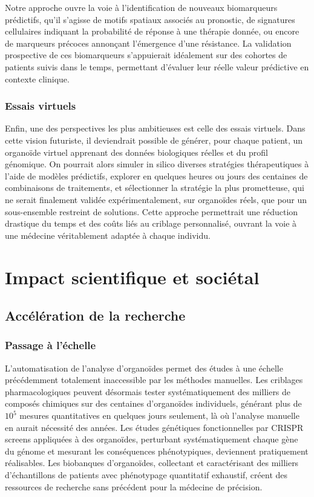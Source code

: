 Notre approche ouvre la voie à l’identification de nouveaux biomarqueurs prédictifs, qu’il s’agisse de motifs spatiaux associés au pronostic, de signatures cellulaires indiquant la probabilité de réponse à une thérapie donnée, ou encore de marqueurs précoces annonçant l’émergence d’une résistance. La validation prospective de ces biomarqueurs s’appuierait idéalement sur des cohortes de patients suivis dans le temps, permettant d’évaluer leur réelle valeur prédictive en contexte clinique.

\subsubsection{Essais virtuels}

Enfin, une des perspectives les plus ambitieuses est celle des essais virtuels. Dans cette vision futuriste, il deviendrait possible de générer, pour chaque patient, un organoïde virtuel apprenant des données biologiques réelles et du profil génomique. On pourrait alors simuler in silico diverses stratégies thérapeutiques à l’aide de modèles prédictifs, explorer en quelques heures ou jours des centaines de combinaisons de traitements, et sélectionner la stratégie la plus prometteuse, qui ne serait finalement validée expérimentalement, sur organoïdes réels, que pour un sous-ensemble restreint de solutions. Cette approche permettrait une réduction drastique du temps et des coûts liés au criblage personnalisé, ouvrant la voie à une médecine véritablement adaptée à chaque individu.

\section{Impact scientifique et sociétal}

\subsection{Accélération de la recherche}

\subsubsection{Passage à l'échelle}

L'automatisation de l'analyse d'organoïdes permet des études à une échelle précédemment totalement inaccessible par les méthodes manuelles. Les criblages pharmacologiques peuvent désormais tester systématiquement des milliers de composés chimiques sur des centaines d'organoïdes individuels, générant plus de $10^5$ mesures quantitatives en quelques jours seulement, là où l'analyse manuelle en aurait nécessité des années. Les études génétiques fonctionnelles par CRISPR screens appliquées à des organoïdes, perturbant systématiquement chaque gène du génome et mesurant les conséquences phénotypiques, deviennent pratiquement réalisables. Les biobanques d'organoïdes, collectant et caractérisant des milliers d'échantillons de patients avec phénotypage quantitatif exhaustif, créent des ressources de recherche sans précédent pour la médecine de précision.

